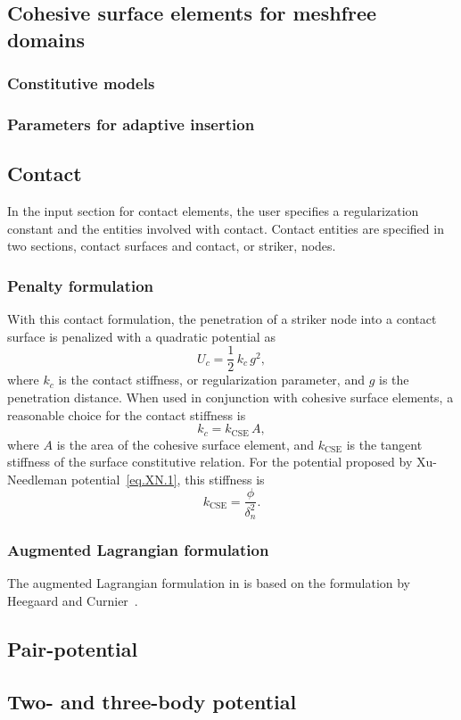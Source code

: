 \subsection{Cohesive surface elements for meshfree domains}
\label{section.element.CSE.MF}

\subsubsection{Constitutive models}
\subsubsection{Parameters for adaptive insertion}

\subsection{Contact}
In the input section for contact elements, the user
specifies a regularization constant and the entities involved with 
contact. Contact entities are specified in two sections, contact 
surfaces and contact, or striker, nodes.
\subsubsection{Penalty formulation}
With this contact formulation, the penetration of a striker node into a 
contact surface is penalized with a quadratic potential as
\begin{equation}
U_{c}= \frac{1}{2}\,k_{c}\,g^{2},
\end{equation}
where $k_{c}$ is the contact stiffness, or regularization parameter,
and $g$ is the penetration 
distance. When used in conjunction with cohesive surface elements, a 
reasonable choice for the contact stiffness is
\begin{equation}
k_{c}=k_{\text{CSE}}\,A,
\end{equation}
where $A$ is the area of the cohesive surface element, and 
$k_{\text{CSE}}$ is the tangent stiffness of the surface 
constitutive relation. For the potential proposed by 
Xu-Needleman potential~\ref{eq.XN.1},
this stiffness is
\begin{equation}
k_{\text{CSE}} = \frac{\phi}{\delta_{n}^{2}}.
\end{equation}

\subsubsection{Augmented Lagrangian formulation}
The augmented Lagrangian formulation in \tahoe is based on the 
formulation by Heegaard and Curnier~\cite{Heegaard1993}.

\subsection{Pair-potential}

\subsection{Two- and three-body potential}

